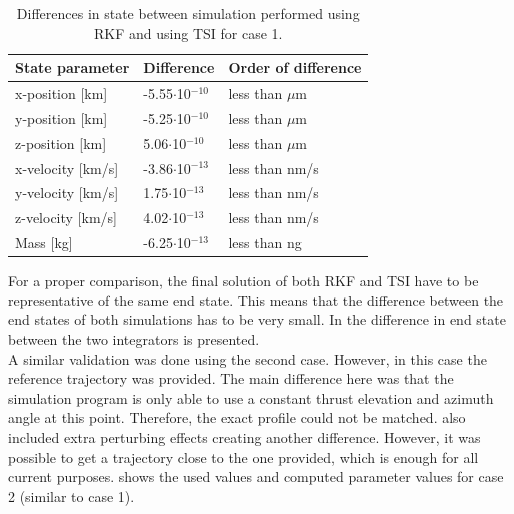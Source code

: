 \begin{table}[H]
\begin{center}
\caption{Differences in state between simulation performed using \ac{RKF} and using \ac{TSI} for case 1.}
\label{tab:differenceEndStateCase1}
\begin{tabular}{|l|l|l|}
\hline 
\textbf{State parameter} & \textbf{Difference} & \textbf{Order of difference} \\ \hline \hline
x-position [km] & -5.55$\cdot$10$^{-10}$ & less than $\mu$m \\ \hline
y-position [km] & -5.25$\cdot$10$^{-10}$ & less than $\mu$m \\ \hline
z-position [km] & 5.06$\cdot$10$^{-10}$ & less than $\mu$m \\ \hline
x-velocity [km/s] & -3.86$\cdot$10$^{-13}$ & less than nm/s \\ \hline
y-velocity [km/s] & 1.75$\cdot$10$^{-13}$ & less than nm/s \\ \hline
z-velocity [km/s] & 4.02$\cdot$10$^{-13}$ & less than nm/s \\ \hline
Mass [kg] &  -6.25$\cdot$10$^{-13}$ & less than ng \\ \hline
		

\end{tabular}
\end{center}
\end{table}



\noindent
For a proper comparison, the final solution of both \ac{RKF} and \ac{TSI} have to be representative of the same end state. This means that the difference between the end states of both simulations has to be very small. In  the difference in end state between the two integrators is presented. \\

\noindent
A similar validation was done using the second case. However, in this case the reference trajectory was provided. The main difference here was that the simulation program is only able to use a constant thrust elevation and azimuth angle at this point. Therefore, the exact profile could not be matched. \cite{benito2016trajectory} also included extra perturbing effects creating another difference. However, it was possible to get a trajectory close to the one provided, which is enough for all current purposes.  shows the used values and computed parameter values for case 2 (similar to case 1). \\ 

